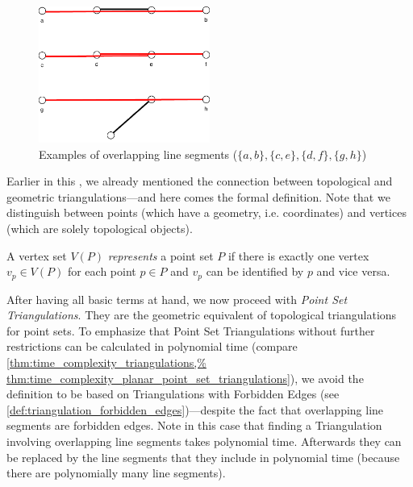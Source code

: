 \begin{figure}[ht]
  \centering
  \includegraphics[width=0.5\textwidth]{img/example_overlapping.pdf}
  \caption{\label{fig:overlapping_segments}%
    Examples of overlapping line segments %
    (\(\{a,b\}, \{c,e\}, \{d,f\}, \{g,h\}\))%
  }
\end{figure}

Earlier in this , we already
mentioned the connection between topological and geometric
triangulations---and here comes the formal definition. Note that
we distinguish between points (which have a geometry, i.e.
coordinates) and vertices (which are solely topological objects).

\begin{definition}
  A vertex set \(V(P)\) \emph{represents} a point set \(P\) if there
  is exactly one vertex \(v_p \in V(P)\) for each point \(p \in P\)
  and \(v_p\) can be identified by \(p\) and vice versa.
%   
\end{definition}

After having all basic terms at hand, we now proceed with
\emph{Point Set Triangulations}. They are the geometric equivalent
of topological triangulations for point sets. To emphasize that
Point Set Triangulations without further restrictions can be 
calculated in polynomial time (compare
\cref{thm:time_complexity_triangulations,%
  thm:time_complexity_planar_point_set_triangulations}),
we avoid the definition to be based on 
Triangulations with Forbidden Edges (see
\cref{def:triangulation_forbidden_edges})---despite the fact that
overlapping line segments are forbidden edges. Note in this case that
finding a Triangulation involving overlapping line segments takes
polynomial time. Afterwards they can be replaced by the line segments
that they include in polynomial time (because there are polynomially
many line segments).


